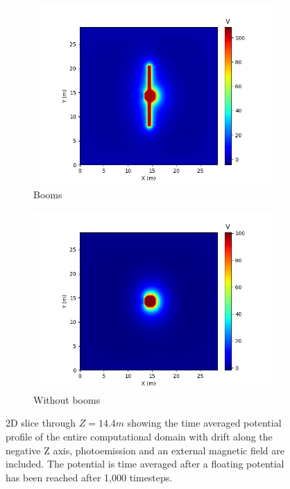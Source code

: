 \begin{figure}[H]
  \begin{subfigure}[b]{0.6\textwidth}
    \includegraphics[width=\textwidth]{figures/MMO/BField/WB/P_BField_WB.png}
    \caption{Booms}
    \label{fig:P_BField_WB}
  \end{subfigure}
  \hfill
  \begin{subfigure}[b]{0.6\textwidth}
    \includegraphics[width=\textwidth]{figures/MMO/BField/NB/P_BField_NB.png}
    \caption{Without booms}
    \label{fig:P_BField_NB}
  \end{subfigure}
  \label{fig:Pot_BField}
  \caption{2D slice through $Z = 14.4 m$ showing the time averaged potential profile of the entire computational domain with drift along the negative Z axis, photoemission and an external magnetic field are included. The potential is time averaged after a floating potential has been reached after 1,000 timesteps.}
\end{figure}

